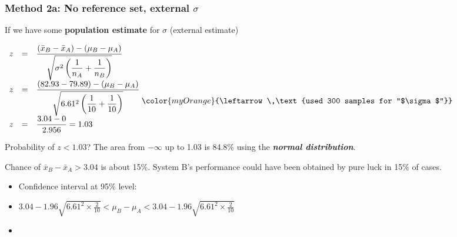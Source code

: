 \begin{frame}\frametitle{Method 2a: No reference set, external $\sigma$}

	If we have some \textbf{population estimate} for $\sigma$ (external estimate)
	
	$
	\begin{array}{rcl}
		z &=& \dfrac{(\bar{x}_B - \bar{x}_A) - (\mu_B - \mu_A)}{\sqrt{\sigma^2 \left( \dfrac{1}{n_A} + \dfrac{1}{n_B}\right)}} \\
		z &=& \dfrac{(82.93-79.89) - (\mu_B - \mu_A)}{\sqrt{6.61^2 \left( \dfrac{1}{10} + \dfrac{1}{10}\right)}} \genfrac{}{}{0pt}{0}{}{\genfrac{}{}{0pt}{0}{}{{\color{myOrange}{\leftarrow \,\text{used 300 samples for ``$\sigma$''}}}}} \\
		z &=& \dfrac{3.04 - 0}{2.956} = 1.03
	\end{array}
	$

	Probability of $z < 1.03$? The area from $-\infty$ up to 1.03 is 84.8\% using the \textbf{\emph{normal distribution}}.

	Chance of $\bar{x}_B - \bar{x}_A > 3.04$ is about 15\%. System B's performance could have been obtained by pure luck in 15\% of cases.
	\begin{itemize}
		\item	Confidence interval at 95\% level:
		\item	$3.04 - 1.96 \sqrt{6.61^2 \times \frac{2}{10}} < \mu_B - \mu_A < 3.04 - 1.96 \sqrt{6.61^2 \times \frac{2}{10}}$
		\item	{\color{myOrange}{$-2.75 < \mu_B - \mu_A < 8.83$}}
	\end{itemize}
\end{frame}

